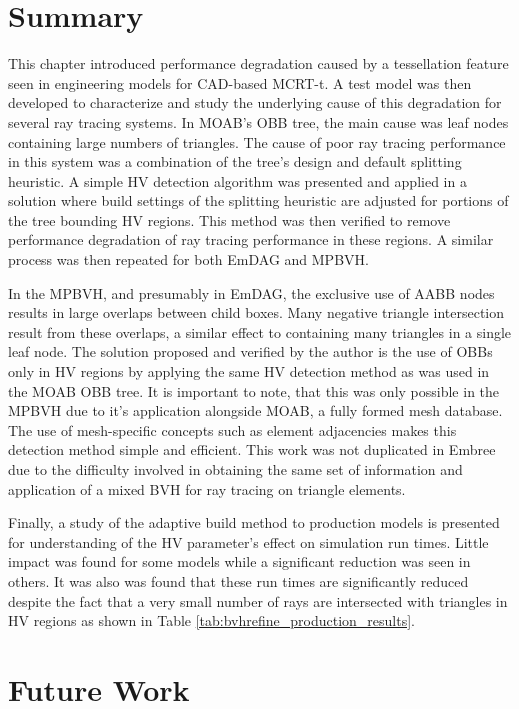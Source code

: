 \section{Summary}

This chapter introduced performance degradation caused by a tessellation feature
seen in engineering models for CAD-based MCRT-t. A test model was then
developed to characterize and study the underlying cause of this degradation for
several ray tracing systems. In MOAB's OBB tree, the main cause was leaf nodes
containing large numbers of triangles. The cause of poor ray tracing performance
in this system was a combination of the tree's design and default splitting
heuristic. A simple HV detection algorithm was presented and applied in a
solution where build settings of the splitting heuristic are adjusted for
portions of the tree bounding HV regions. This method was then verified to
remove performance degradation of ray tracing performance in these regions. A
similar process was then repeated for both EmDAG and MPBVH.

In the MPBVH, and presumably in EmDAG, the exclusive use of AABB nodes results
in large overlaps between child boxes. Many negative triangle intersection
result from these overlaps, a similar effect to containing many
triangles in a single leaf node. The solution proposed and verified by the
author is the use of OBBs only in HV regions by applying the same HV detection
method as was used in the MOAB OBB tree. It is important to note, that this was
only possible in the MPBVH due to it's application alongside MOAB, a fully
formed mesh database. The use of mesh-specific concepts such as element
adjacencies makes this detection method simple and efficient. This work was not
duplicated in Embree due to the difficulty involved in obtaining the same set of
information and application of a mixed BVH for ray tracing on triangle elements.

Finally, a study of the adaptive build method to production models is presented
for understanding of the HV parameter's effect on simulation run times. Little
impact was found for some models while a significant reduction was seen in
others. It was also was found that these run times are significantly reduced
despite the fact that a very small number of rays are intersected with triangles
in HV regions as shown in Table \ref{tab:bvhrefine_production_results}.

\section{Future Work}


